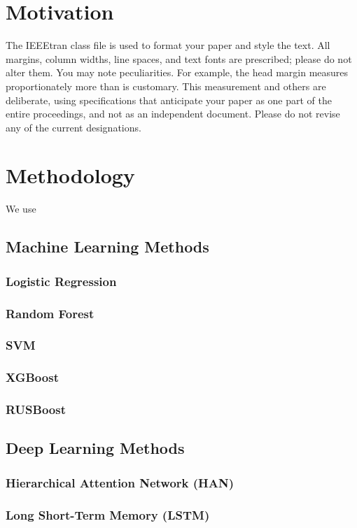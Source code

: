 \documentclass[conference]{IEEEtran}
\begin{document}
\section{Motivation}

The IEEEtran class file is used to format your paper and style the text. All margins, 
column widths, line spaces, and text fonts are prescribed; please do not 
alter them. You may note peculiarities. For example, the head margin
measures proportionately more than is customary. This measurement 
and others are deliberate, using specifications that anticipate your paper 
as one part of the entire proceedings, and not as an independent document. 
Please do not revise any of the current designations.

\section{Methodology} We use 

\subsection{Machine Learning Methods} 
\subsubsection{Logistic Regression} 
\subsubsection{Random Forest}
\subsubsection{SVM}
\subsubsection{XGBoost}
\subsubsection{RUSBoost}
\subsection{Deep Learning Methods}
\subsubsection{Hierarchical Attention Network (HAN)}
\subsubsection{Long Short-Term Memory (LSTM)}
\end{document}
